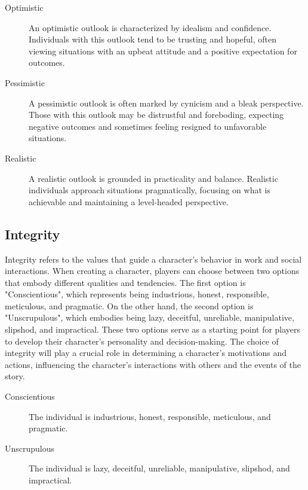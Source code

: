 \documentclass[12pt]{book}  %
\begin{document}
\begin{description}
    \item[Optimistic] An optimistic outlook is characterized by idealism and confidence. Individuals with this outlook tend to be trusting and hopeful, often viewing situations with an upbeat attitude and a positive expectation for outcomes.
    \item[Pessimistic] A pessimistic outlook is often marked by cynicism and a bleak perspective. Those with this outlook may be distrustful and foreboding, expecting negative outcomes and sometimes feeling resigned to unfavorable situations.
    \item[Realistic] A realistic outlook is grounded in practicality and balance. Realistic individuals approach situations pragmatically, focusing on what is achievable and maintaining a level-headed perspective.
\end{description}

\subsection{\textbf{Integrity}}

Integrity refers to the values that guide a character's behavior in work and social interactions. When creating a character, players can choose between two options that embody different qualities and tendencies. The first option is "Conscientious", which represents being industrious, honest, responsible, meticulous, and pragmatic. On the other hand, the second option is "Unscrupulous", which embodies being lazy, deceitful, unreliable, manipulative, slipshod, and impractical. These two options serve as a starting point for players to develop their character's personality and decision-making. The choice of integrity will play a crucial role in determining a character's motivations and actions, influencing the character's interactions with others and the events of the story.

\begin{description}
    \item[Conscientious] The individual is industrious, honest, responsible, meticulous, and pragmatic.
    \item[Unscrupulous] The individual is lazy, deceitful, unreliable, manipulative, slipshod, and impractical.
\end{description}
\end{document}
